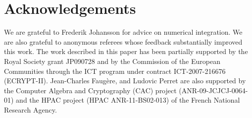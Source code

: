 \documentclass[draft]{llncs}[11pt]
\def\isanonymous{0}
\newcommand{\anonymous}[2]{
\ifthenelse{\equal{\isanonymous}{1}}
{{#1}}
{{#2}}
}
\begin{document}
\anonymous{}
{\section*{Acknowledgements} We are grateful to Frederik Johansson for advice on numerical integration. We are also grateful to anonymous referees whose feedback substantially improved this work. The work described in this paper has been partially supported by the Royal Society grant JP090728 and by the Commission of the European Communities through the ICT program under contract ICT-2007-216676 (ECRYPT-II).
Jean-Charles Faugère, and Ludovic Perret are also supported by the Computer Algebra and Cryptography (CAC) project (ANR-09-JCJCJ-0064-01) and the HPAC project (HPAC ANR-11-BS02-013) 
of the French National Research Agency.
}
\clearpage



\clearpage
\appendix
\end{document}
